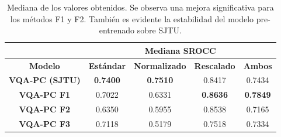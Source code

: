 \begin{table}[htp]
  \scriptsize
  \centering
\begin{tabular}{|c|cccc|}
\hline
\rowcolor[HTML]{FFC702}
                       & \multicolumn{4}{c|}{\textbf{Mediana SROCC}}                                                                                                          \\ \hline
\rowcolor[HTML]{FFC702}
\textbf{Modelo}        & \multicolumn{1}{c|}{\textbf{Estándar}} & \multicolumn{1}{c|}{\textbf{Normalizado}} & \multicolumn{1}{c|}{\textbf{Rescalado}} & \textbf{Ambos}  \\ \hline
\textbf{VQA-PC (SJTU)} & \multicolumn{1}{c|}{\textbf{0.7400}}   & \multicolumn{1}{c|}{\textbf{0.7510}}      & \multicolumn{1}{c|}{0.8417}             & 0.7434          \\ \hline
\textbf{VQA-PC F1}     & \multicolumn{1}{c|}{0.7022}            & \multicolumn{1}{c|}{0.6331}               & \multicolumn{1}{c|}{\textbf{0.8636}}    & \textbf{0.7849} \\ \hline
\textbf{VQA-PC F2}     & \multicolumn{1}{c|}{0.6350}            & \multicolumn{1}{c|}{0.5955}               & \multicolumn{1}{c|}{0.8538}             & 0.7165          \\ \hline
\textbf{VQA-PC F3}     & \multicolumn{1}{c|}{0.7118}            & \multicolumn{1}{c|}{0.5179}               & \multicolumn{1}{c|}{0.7518}             & 0.7334          \\ \hline
\end{tabular}
\caption[Mediana de los valores sobre imágenes médicas.]{
  Mediana de los valores obtenidos. Se observa una mejora significativa para 
  los métodos F1 y F2. También es evidente la estabilidad del modelo pre-entrenado
  sobre SJTU\cite{SJTU}. 
}
\label{tab:PercentileMed}
\end{table}


